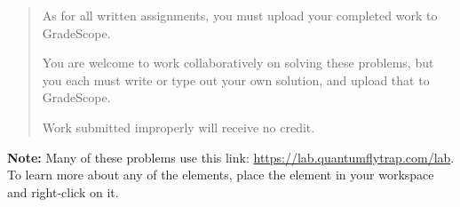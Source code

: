 \documentclass[12pt]{article}
\begin{document}

\begin{quote}
    As for all written assignments, you must upload your completed work to GradeScope.

    You are welcome to work collaboratively on solving these problems, but you each must write or type out your own solution, and upload that to GradeScope.

    Work submitted improperly will receive no credit.
\end{quote}


\noindent \textbf{Note:} Many of these problems use this link: \href{https://lab.quantumflytrap.com/lab}{https://lab.quantumflytrap.com/lab}. To learn more about any of the elements, place the element in your workspace and right-click on it.
\end{document}
